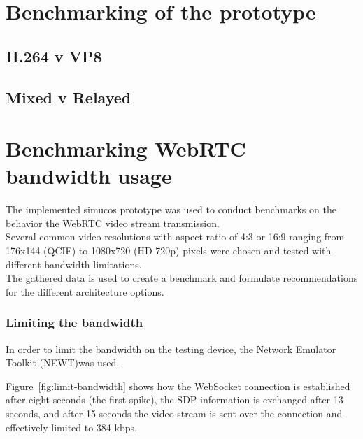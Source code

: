 \documentclass[../../../thesis.tex]{subfiles}
\begin{document}
\comment
\chapter{Benchmarking of the prototype}
\section{H.264 v VP8}
\todo{}
\section{Mixed v Relayed}
\todo{}
\endcomment

\chapter{Benchmarking WebRTC bandwidth usage}

\label{sec:benchmark-bandwidth}
The implemented simucos prototype was used to conduct benchmarks on the behavior the WebRTC video stream transmission.\\

\noindent
Several common video resolutions with aspect ratio of 4:3 or 16:9 ranging from 176x144 (QCIF) to 1080x720 (HD 720p) pixels were chosen and tested with different bandwidth limitations.\\

\noindent
The gathered data is used to create a benchmark and formulate recommendations for the different architecture options.

\subsection{Limiting the bandwidth}
In order to limit the bandwidth on the testing device, the Network Emulator Toolkit (NEWT)\footnotemark was used.

Figure~\ref{fig:limit-bandwidth} shows how the WebSocket connection is established after eight seconds (the first spike), the SDP information is exchanged after 13 seconds, and after 15 seconds the video stream is sent over the connection and effectively limited to 384 kbps.\\
\end{document}
